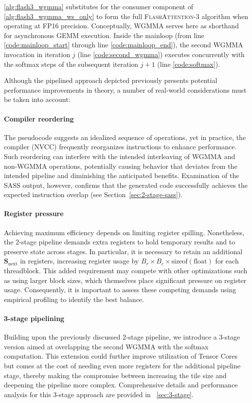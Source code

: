 \cref{alg:flash3_wgmma} substitutes for the consumer component of \cref{alg:flash3_wgmma_ws_only} to form the full \textsc{FlashAttention-3} algorithm when operating at FP16 precision. Conceptually, WGMMA serves here as shorthand for asynchronous GEMM execution. Inside the mainloop (from line \ref{code:mainloop_start} through line \ref{code:mainloop_end}), the second WGMMA invocation in iteration $j$ (line \ref{code:second_wgmma}) executes concurrently with the softmax steps of the subsequent iteration $j+1$ (line \ref{code:softmax}).

Although the pipelined approach depicted previously presents potential performance improvements in theory, a number of real-world considerations must be taken into account:

\paragraph{Compiler reordering} The pseudocode suggests an idealized sequence of operations, yet in practice, the compiler (NVCC) frequently reorganizes instructions to enhance performance. Such reordering can interfere with the intended interleaving of WGMMA and non-WGMMA operations, potentially causing behavior that deviates from the intended pipeline and diminishing the anticipated benefits. Examination of the SASS output, however, confirms that the generated code successfully achieves the expected instruction overlap (see Section~\ref{sec:2-stage-sass}).

\paragraph{Register pressure} Achieving maximum efficiency depends on limiting register spilling. Nonetheless, the 2-stage pipeline demands extra registers to hold temporary results and to preserve state across stages. In particular, it is necessary to retain an additional $\mathbf{S}_{\mathrm{next}}$ in registers, increasing register usage by $B_r \times B_c \times \text{sizeof}(\text{float})$ for each threadblock. This added requirement may compete with other optimizations such as using larger block sizes, which themselves place significant pressure on register usage. Consequently, it is important to assess these competing demands using empirical profiling to identify the best balance.

\paragraph{3-stage pipelining} Building upon the previously discussed 2-stage pipeline, we introduce a 3-stage version aimed at overlapping the second WGMMA with the softmax computation. This extension could further improve utilization of Tensor Cores but comes at the cost of needing even more registers for the additional pipeline stage, thereby making the compromise between increasing the tile size and deepening the pipeline more complex. Comprehensive details and performance analysis for this 3-stage approach are provided in ~\cref{sec:3-stage}.


